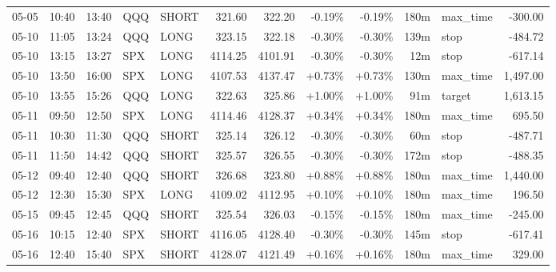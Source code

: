\documentclass[11pt,a4paper,twoside]{article}
\begin{document}
\begin{center}
\begin{longtable}{>{\color{txtmain}}l l l l l r r r r r >{\color{txtmain}}l r}
05-05 & 10:40 & 13:40 & QQQ & SHORT & 321.60 & 322.20 & \textcolor{lossred}{-0.19\%} & \textcolor{lossred}{-0.19\%} & 180m & max\_time & \textcolor{lossred}{-300.00} \\
05-10 & 11:05 & 13:24 & QQQ & LONG & 323.15 & 322.18 & \textcolor{lossred}{-0.30\%} & \textcolor{lossred}{-0.30\%} & 139m & stop & \textcolor{lossred}{-484.72} \\
05-10 & 13:15 & 13:27 & SPX & LONG & 4114.25 & 4101.91 & \textcolor{lossred}{-0.30\%} & \textcolor{lossred}{-0.30\%} & 12m & stop & \textcolor{lossred}{-617.14} \\
05-10 & 13:50 & 16:00 & SPX & LONG & 4107.53 & 4137.47 & \textcolor{wingreen}{+0.73\%} & \textcolor{wingreen}{+0.73\%} & 130m & max\_time & \textcolor{wingreen}{1,497.00} \\
05-10 & 13:55 & 15:26 & QQQ & LONG & 322.63 & 325.86 & \textcolor{wingreen}{+1.00\%} & \textcolor{wingreen}{+1.00\%} & 91m & target & \textcolor{wingreen}{1,613.15} \\
05-11 & 09:50 & 12:50 & SPX & LONG & 4114.46 & 4128.37 & \textcolor{wingreen}{+0.34\%} & \textcolor{wingreen}{+0.34\%} & 180m & max\_time & \textcolor{wingreen}{695.50} \\
05-11 & 10:30 & 11:30 & QQQ & SHORT & 325.14 & 326.12 & \textcolor{lossred}{-0.30\%} & \textcolor{lossred}{-0.30\%} & 60m & stop & \textcolor{lossred}{-487.71} \\
05-11 & 11:50 & 14:42 & QQQ & SHORT & 325.57 & 326.55 & \textcolor{lossred}{-0.30\%} & \textcolor{lossred}{-0.30\%} & 172m & stop & \textcolor{lossred}{-488.35} \\
05-12 & 09:40 & 12:40 & QQQ & SHORT & 326.68 & 323.80 & \textcolor{wingreen}{+0.88\%} & \textcolor{wingreen}{+0.88\%} & 180m & max\_time & \textcolor{wingreen}{1,440.00} \\
05-12 & 12:30 & 15:30 & SPX & LONG & 4109.02 & 4112.95 & \textcolor{wingreen}{+0.10\%} & \textcolor{wingreen}{+0.10\%} & 180m & max\_time & \textcolor{wingreen}{196.50} \\
05-15 & 09:45 & 12:45 & QQQ & SHORT & 325.54 & 326.03 & \textcolor{lossred}{-0.15\%} & \textcolor{lossred}{-0.15\%} & 180m & max\_time & \textcolor{lossred}{-245.00} \\
05-16 & 10:15 & 12:40 & SPX & SHORT & 4116.05 & 4128.40 & \textcolor{lossred}{-0.30\%} & \textcolor{lossred}{-0.30\%} & 145m & stop & \textcolor{lossred}{-617.41} \\
05-16 & 12:40 & 15:40 & SPX & SHORT & 4128.07 & 4121.49 & \textcolor{wingreen}{+0.16\%} & \textcolor{wingreen}{+0.16\%} & 180m & max\_time & \textcolor{wingreen}{329.00} \\

\end{longtable}
\end{center}
\end{document}
